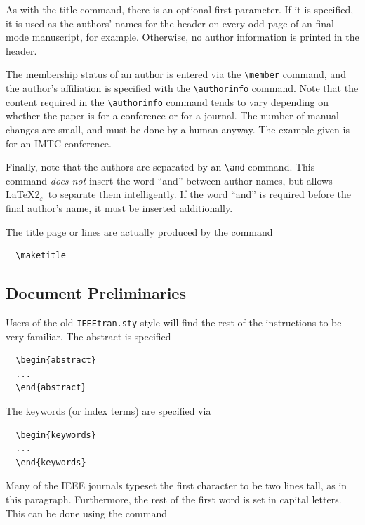 \documentclass[%
	final,
	notitlepage,
	narroweqnarray,
	inline,
	twoside,
	]{ieee}
\newcommand{\latexiie}{\LaTeX2{\Large$_\varepsilon$}}
\begin{document}
As with the title command, there is an optional first parameter. If it
is specified, it is used as the authors' names for the header on every
odd page of an final-mode manuscript, for example.  Otherwise, no
author information is printed in the header.

The membership status of an author is entered via the 
\verb|\member| command, and the author's affiliation is specified
with the \verb|\authorinfo| command.  Note that the content required
in the \verb|\authorinfo| command tends to vary depending on whether
the paper is for a conference or for a journal. The number of manual
changes are small, and must be done by a human anyway. The example
given is for an IMTC conference.

Finally, note that the authors are separated by an \verb|\and|
command.  This command \emph{does not} insert the word ``and'' between
author names, but allows \latexiie\ to separate them intelligently. If
the word ``and'' is required before the final author's name, it must
be inserted additionally.

The title page or lines are actually produced by the command
\begin{verbatim}
  \maketitle
\end{verbatim}

\subsection{Document Preliminaries}

Users of the old \texttt{IEEEtran.sty} style will find the rest of the
instructions to be very familiar. The abstract is specified
\begin{verbatim}
  \begin{abstract} 
  ...
  \end{abstract}
\end{verbatim}
The keywords (or index terms) are specified via
\begin{verbatim}
  \begin{keywords}
  ...
  \end{keywords}
\end{verbatim}

\PARstart Many of the IEEE journals typeset the first character to be
two lines tall, as in this paragraph. Furthermore, the rest of the
first word is set in capital letters. This can be done using the
command
\end{document}
